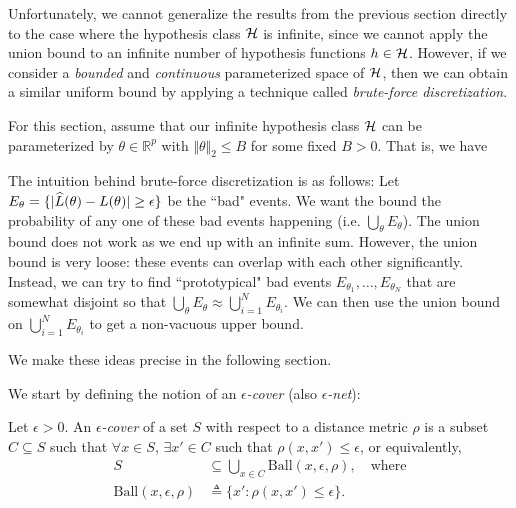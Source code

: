Unfortunately, we cannot generalize the results from the previous section directly to the case where the hypothesis class $\mathcal H$ is infinite, since we cannot apply the union bound to an infinite number of hypothesis functions $h \in \mathcal H$. However, if we consider a \emph{bounded} and \emph{continuous} parameterized space of $\mathcal H$, then we can obtain a similar uniform bound by applying a technique called \emph{brute-force discretization}.

For this section, assume that our infinite hypothesis class $\mathcal H$ can be parameterized by $\theta \in \mathbb{R}^p$ with $\Vert \theta \Vert_2 \leq B$ for some fixed $B > 0$. That is, we have 

The intuition behind brute-force discretization is as follows: Let $E_\theta = \{ |\widehat{L}(\theta) - L(\theta)| \geq \epsilon \}$ be the ``bad" events. We want the bound the probability of any one of these bad events happening (i.e. $\bigcup_\theta E_\theta$). The union bound does not work as we end up with an infinite sum. However, the union bound is very loose: these events can overlap with each other significantly. Instead, we can try to find ``prototypical" bad events $E_{\theta_1}, \dots, E_{\theta_N}$ that are somewhat disjoint so that $\bigcup_\theta E_\theta \approx \bigcup_{i=1}^N E_{\theta_i}$. We can then use the union bound on $\bigcup_{i=1}^N E_{\theta_i}$ to get a non-vacuous upper bound.

We make these ideas precise in the following section.


We start by defining the notion of an \emph{$\epsilon$-cover} (also \textit{$\epsilon$-net}):

\begin{definition}
Let $\epsilon>0$. An \emph{$\epsilon$-cover} of a set $S$ with respect to a distance metric $\rho$ is a subset $C \subseteq S$ such that $\forall x \in S$, $\exists x' \in C$ such that $\rho(x,x') \le \epsilon$, or equivalently,
\begin{align}
S &\subseteq \bigcup_{x \in C} \mathrm{Ball}(x, \epsilon, \rho), \quad \text{where} \\
\mathrm{Ball}(x, \epsilon, \rho) &\triangleq \{ x': \rho(x, x') \leq \epsilon \}.
\end{align}
\end{definition}

